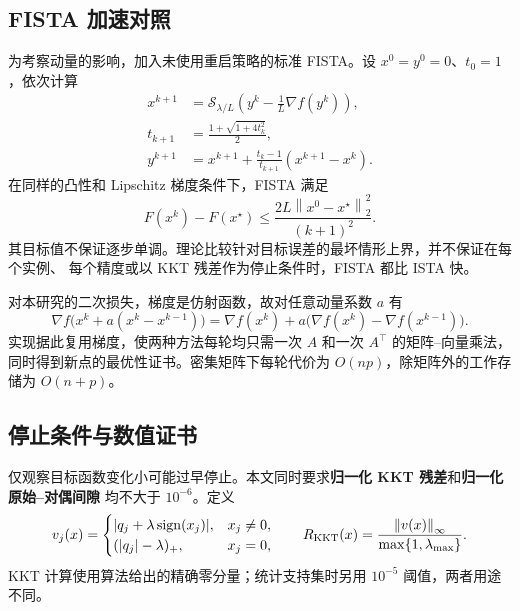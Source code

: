 \documentclass[UTF8,11pt,a4paper,fontset=fandol]{ctexart}
\newcommand{\soft}{\mathcal{S}}
\newcommand{\norm}[1]{\left\|#1\right\|}
\begin{document}
\subsection{FISTA 加速对照}
为考察动量的影响，加入未使用重启策略的标准 FISTA。设 $x^0=y^0=0$、$t_0=1$，依次计算
\begin{align}
 x^{k+1}&=\soft_{\lambda/L}\left(y^k-\frac{1}{L}\nabla f(y^k)\right),\\
 t_{k+1}&=\frac{1+\sqrt{1+4t_k^2}}{2},\\
 y^{k+1}&=x^{k+1}+\frac{t_k-1}{t_{k+1}}(x^{k+1}-x^k).
\end{align}
在同样的凸性和 Lipschitz 梯度条件下，FISTA 满足\cite{beck}
\begin{equation}
 F(x^k)-F(x^\star)\le
 \frac{2L\norm{x^0-x^\star}_2^2}{(k+1)^2}.
 \label{eq:fistarate}
\end{equation}
其目标值不保证逐步单调。理论比较针对目标误差的最坏情形上界，并不保证在每个实例、
每个精度或以 KKT 残差作为停止条件时，FISTA 都比 ISTA 快。

对本研究的二次损失，梯度是仿射函数，故对任意动量系数 $a$ 有
\begin{equation}
 \nabla f\big(x^k+a(x^k-x^{k-1})\big)
 =\nabla f(x^k)+a\big(\nabla f(x^k)-\nabla f(x^{k-1})\big).
\end{equation}
实现据此复用梯度，使两种方法每轮均只需一次 $A$ 和一次 $A^\top$ 的矩阵--向量乘法，
同时得到新点的最优性证书。密集矩阵下每轮代价为 $O(np)$，除矩阵外的工作存储为 $O(n+p)$。

\subsection{停止条件与数值证书}
仅观察目标函数变化小可能过早停止。本文同时要求\textbf{归一化 KKT 残差}和\textbf{归一化原始--对偶间隙}
均不大于 $10^{-6}$。定义
\begin{equation}
 v_j(x)=\begin{cases}|q_j+\lambda\operatorname{sign}(x_j)|,&x_j\ne0,\\
 (|q_j|-\lambda)_+,&x_j=0,
 \end{cases}
 \qquad R_{\rm KKT}(x)=\frac{\norm{v(x)}_\infty}{\max\{1,\lambda_{\max}\}}.
\end{equation}
KKT 计算使用算法给出的精确零分量；统计支持集时另用 $10^{-5}$ 阈值，两者用途不同。
\end{document}
